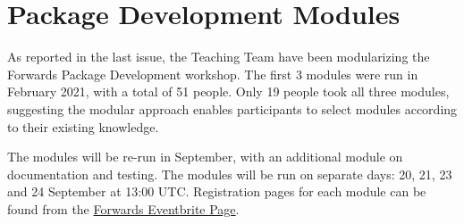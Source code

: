 \section{Package Development Modules}

As reported in the last issue, the Teaching Team have been modularizing the Forwards Package Development workshop. The first 3 modules were run in February 2021, with a total of 51 people. Only 19 people took all three modules, suggesting the modular approach enables participants to select modules  according to their existing knowledge.

The modules will be re-run in September, with an additional module on documentation and testing. The modules will be run on separate days: 20, 21, 23 and 24 September at 13:00 UTC. Registration pages for each module can be found from the \href{https://github.com/forwards/website_source/pull/119/commits/6e7652ba5190d8da7fd7caefb20e938f64423c7f}{Forwards Eventbrite Page}.

\address{Heather Turner\\
  University of Warwick, UK\\
  }